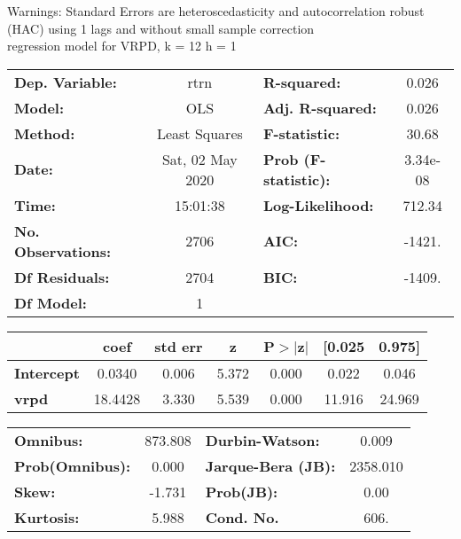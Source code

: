 Warnings: \newline
 [1] Standard Errors are heteroscedasticity and autocorrelation robust (HAC) using 1 lags and without small sample correction\\ 

regression model for VRPD, k = 12 h = 1\begin{center}
\begin{tabular}{lclc}
\toprule
\textbf{Dep. Variable:}    &       rtrn       & \textbf{  R-squared:         } &     0.026   \\
\textbf{Model:}            &       OLS        & \textbf{  Adj. R-squared:    } &     0.026   \\
\textbf{Method:}           &  Least Squares   & \textbf{  F-statistic:       } &     30.68   \\
\textbf{Date:}             & Sat, 02 May 2020 & \textbf{  Prob (F-statistic):} &  3.34e-08   \\
\textbf{Time:}             &     15:01:38     & \textbf{  Log-Likelihood:    } &    712.34   \\
\textbf{No. Observations:} &        2706      & \textbf{  AIC:               } &    -1421.   \\
\textbf{Df Residuals:}     &        2704      & \textbf{  BIC:               } &    -1409.   \\
\textbf{Df Model:}         &           1      & \textbf{                     } &             \\
\bottomrule
\end{tabular}
\begin{tabular}{lcccccc}
                   & \textbf{coef} & \textbf{std err} & \textbf{z} & \textbf{P$> |$z$|$} & \textbf{[0.025} & \textbf{0.975]}  \\
\midrule
\textbf{Intercept} &       0.0340  &        0.006     &     5.372  &         0.000        &        0.022    &        0.046     \\
\textbf{vrpd}      &      18.4428  &        3.330     &     5.539  &         0.000        &       11.916    &       24.969     \\
\bottomrule
\end{tabular}
\begin{tabular}{lclc}
\textbf{Omnibus:}       & 873.808 & \textbf{  Durbin-Watson:     } &    0.009  \\
\textbf{Prob(Omnibus):} &   0.000 & \textbf{  Jarque-Bera (JB):  } & 2358.010  \\
\textbf{Skew:}          &  -1.731 & \textbf{  Prob(JB):          } &     0.00  \\
\textbf{Kurtosis:}      &   5.988 & \textbf{  Cond. No.          } &     606.  \\
\bottomrule
\end{tabular}
\end{center}

